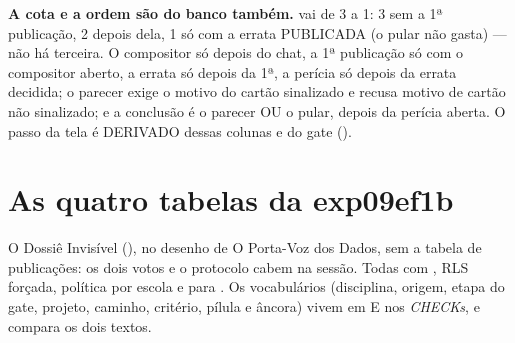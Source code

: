 \begin{regra}
\textbf{A cota e a ordem são do banco também.}  vai de
3 a 1: 3 sem a 1ª publicação, 2 depois dela, 1 só com a errata PUBLICADA (o
pular não gasta) --- não há terceira. O compositor só depois do chat, a 1ª
publicação só com o compositor aberto, a errata só depois da 1ª, a perícia só
depois da errata decidida; o parecer exige o motivo do cartão sinalizado e
recusa motivo de cartão não sinalizado; e a conclusão é o parecer OU o pular,
depois da perícia aberta. O passo da tela é DERIVADO dessas colunas e do gate
().
\end{regra}

\section{As quatro tabelas da exp09ef1b}
\label{sec:tabelas-exp09ef1b}

O Dossiê Invisível (), no desenho de O Porta-Voz dos Dados, sem
a tabela de publicações: os dois votos e o protocolo cabem na sessão. Todas
com , RLS forçada, política por escola e 
para . Os vocabulários (disciplina, origem, etapa do gate,
projeto, caminho, critério, pílula e âncora) vivem em
 E nos \emph{CHECKs}, e
 compara os dois textos.

